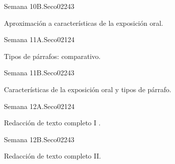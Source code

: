 \begin{syllabus}
\begin{unit}{Semana 10B.}{Seco02}{24}{3}
   \begin{topics}
      \item Aproximación a características de la exposición oral.
   \end{topics}

   \begin{unitgoals}
      \item 
      \item
      \item 
      \end{unitgoals}
\end{unit}


\begin{unit}{Semana 11A.}{Seco02}{12}{4}
   \begin{topics}
      \item Tipos de párrafos: comparativo.
   \end{topics}
   \begin{unitgoals}
      \item 
   \end{unitgoals}
\end{unit}

\begin{unit}{Semana 11B.}{Seco02}{24}{3}
   \begin{topics}
      \item Características de la exposición oral y tipos de párrafo.
   \end{topics}

   \begin{unitgoals}
      \item 
      \item
      \item 
      \end{unitgoals}
\end{unit}


\begin{unit}{Semana 12A.}{Seco02}{12}{4}
   \begin{topics}
      \item Redacción de texto completo I .
   \end{topics}
   \begin{unitgoals}
      \item 
   \end{unitgoals}
\end{unit}

\begin{unit}{Semana 12B.}{Seco02}{24}{3}
   \begin{topics}
      \item Redacción de texto completo  II.
   \end{topics}


\end{unit}
\end{syllabus}
